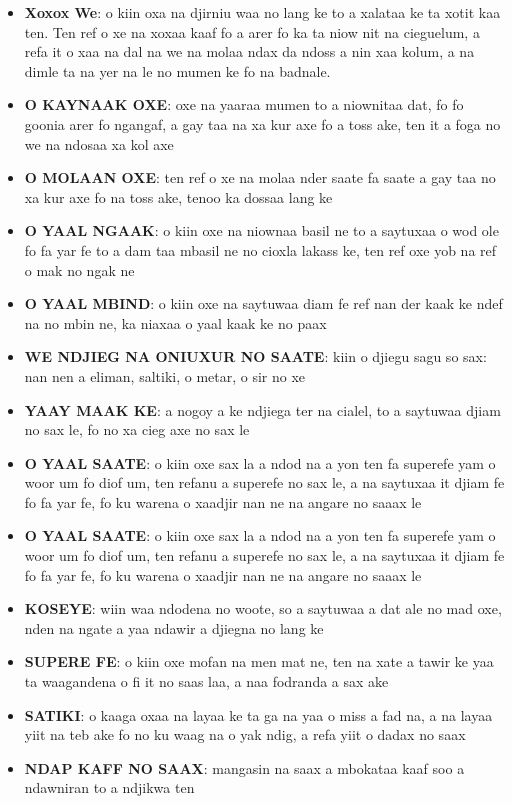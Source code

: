 \begin{paracol}{2}
  \switchcolumn %
  \begin{itemize}
    \item \textbf{Xoxox We}: o kiin oxa na djirniu waa no lang ke to a xalataa ke ta xotit kaa ten. Ten ref o xe na xoxaa kaaf fo a arer fo ka ta niow nit na cieguelum, a refa it o xaa na dal na we na molaa ndax da ndoss a nin xaa kolum, a na dimle ta na yer na le no mumen ke fo na badnale.
    \item \textbf{O KAYNAAK OXE}: oxe na yaaraa mumen to a niownitaa dat, fo fo goonia arer fo ngangaf, a gay taa na xa kur axe fo a toss ake, ten it a foga no we na ndosaa xa kol axe
    \item \textbf{O MOLAAN OXE}: ten ref o xe na molaa nder saate fa saate a gay taa no xa kur axe fo na toss ake, tenoo ka dossaa lang ke
    \item \textbf{O YAAL NGAAK}: o kiin oxe na niownaa basil ne to a saytuxaa o wod ole fo fa yar fe to a dam taa mbasil ne no cioxla lakass ke, ten ref oxe yob na ref o mak no ngak ne
    \item \textbf{O YAAL MBIND}: o kiin oxe na saytuwaa diam fe ref nan der kaak ke ndef na no mbin ne, ka niaxaa o yaal kaak ke no paax
    \item \textbf{WE NDJIEG NA ONIUXUR NO SAATE}: kiin o djiegu sagu so sax: nan nen a eliman, saltiki, o metar, o sir no xe
    \item \textbf{YAAY MAAK KE}: a nogoy a ke ndjiega ter na cialel, to a saytuwaa djiam no sax le, fo no xa cieg axe no sax le
    \item \textbf{O YAAL SAATE}: o kiin oxe sax la a ndod na a yon ten fa superefe yam o woor um fo diof um, ten refanu a superefe no sax le, a na saytuxaa it djiam fe fo fa yar fe, fo ku warena o xaadjir nan ne na angare no saaax le
    \item \textbf{O YAAL SAATE}: o kiin oxe sax la a ndod na a yon ten fa superefe yam o woor um fo diof um, ten refanu a superefe no sax le, a na saytuxaa it djiam fe fo fa yar fe, fo ku warena o xaadjir nan ne na angare no saaax le
    \item \textbf{KOSEYE}: wiin waa ndodena no woote, so a saytuwaa a dat ale no mad oxe, nden na ngate a yaa ndawir a djiegna no lang ke
    \item \textbf{SUPERE FE}: o kiin oxe mofan na men mat ne, ten na xate a tawir ke yaa ta waagandena o fi it no saas laa, a naa fodranda a sax ake
    \item \textbf{SATIKI}: o kaaga oxaa na layaa ke ta ga na yaa o miss a fad na, a na layaa yiit na teb ake fo no ku waag na o yak ndig, a refa yiit o dadax no saax
    \item \textbf{NDAP KAFF NO SAAX}: mangasin na saax a mbokataa kaaf soo a ndawniran to a ndjikwa ten
  \end{itemize}
  \switchcolumn %


\end{paracol}
